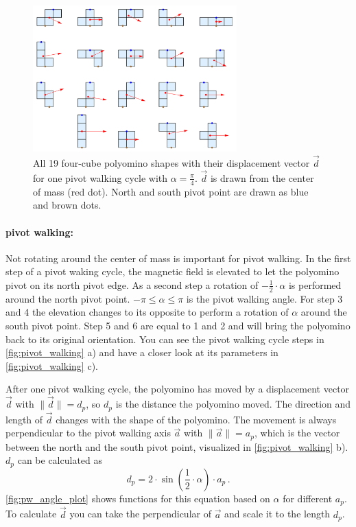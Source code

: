 \begin{figure}
	\centering
	\includegraphics[width=0.70\textwidth]{figures/displacement_pivot_walking.png}
	\caption[Polyomino shapes with different displacement vectors]{All 19 four-cube polyomino shapes with their displacement vector $\vec{d}$ for one pivot walking cycle with $\alpha = \frac{\pi}{4}$. $\vec{d}$ is drawn from the center of mass (red dot). North and south pivot point are drawn as blue and brown dots.}
	\label{fig:displacement_pivot_walking}
\end{figure}

\paragraph{pivot walking:}
Not rotating around the center of mass is important for pivot walking.
In the first step of a pivot waking cycle, the magnetic field is elevated to let the polyomino pivot on its north pivot edge.
As a second step a rotation of $-\frac{1}{2} \cdot \alpha$ is performed around the north pivot point.
$-\pi \leq \alpha \leq \pi$ is the pivot walking angle.
For step 3 and 4 the elevation changes to its opposite to perform a rotation of $\alpha$ around the south pivot point.
Step 5 and 6 are equal to 1 and 2 and will bring the polyomino back to its original orientation.
You can see the pivot walking cycle steps in \autoref{fig:pivot_walking} a) and have a closer look at its parameters in \autoref{fig:pivot_walking} c).

After one pivot walking cycle, the polyomino has moved by a displacement vector $\vec{d}$ with $\lVert \vec{d} \rVert = d_p$, so $d_p$ is the distance the polyomino moved.
The direction and length of $\vec{d}$ changes with the shape of the polyomino.
The movement is always perpendicular to the pivot walking axis $\vec{a}$ with $\lVert \vec{a} \rVert = a_p$, which is the vector between the north and the south pivot point, visualized in \autoref{fig:pivot_walking} b).
$d_p$ can be calculated as
\begin{equation}
d_p = 2 \cdot \sin\left(\frac{1}{2} \cdot \alpha \right) \cdot a_p \,.
\end{equation}
\autoref{fig:pw_angle_plot} shows functions for this equation based on $\alpha$ for different $a_p$.
To calculate $\vec{d}$ you can take the perpendicular of $\vec{a}$ and scale it to the length $d_p$.

